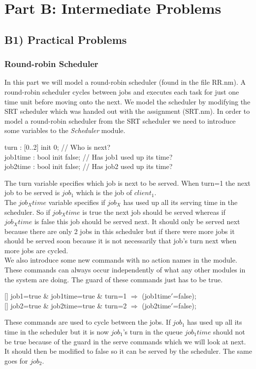 \documentclass[12pt]{report}
\begin{document}
\chapter*{Part B: Intermediate Problems}
\section*{B1) Practical Problems}
\subsection*{Round-robin Scheduler}
In this part we will model a round-robin scheduler (found in the file RR.nm). A round-robin scheduler cycles between jobs and executes each task for just one time unit before moving onto the next. We model the scheduler by modifying the SRT scheduler which was handed out with the assignment (SRT.nm). In order to model a round-robin scheduler from the SRT scheduler we need to introduce some variables to the \emph{Scheduler} module.
\begin{center}
turn : {[0..2]} init 0; // Who is next?\\
job1time : bool init false; // Has job1 used up its time?\\
job2time : bool init false; // Has job2 used up its time?\\
\end{center}
The turn variable specifies which job is next to be served. When turn=1 the next job to be served is $job_1$ which is the job of $client_1$.\\
The $job_Xtime$ variable specifies if $job_X$ has used up all its serving time in the scheduler. So if $job_Xtime$ is true the next job should be served whereas if $job_Xtime$ is false this job should be served next. It should only be served next because there are only 2 jobs in this scheduler but if there were more jobs it should be served soon because it is not necessarily that job's turn next when more jobs are cycled.\\
We also introduce some new commands with no action names in the module. These commands can always occur independently of what any other modules in the system are doing. The guard of these commands just has to be true.
\begin{center}
{[]} job1=true \& job1time=true \& turn=1 $\Rightarrow$ (job1time$'$=false);\\
{[]} job2=true \& job2time=true \& turn=2 $\Rightarrow$ (job2time$'$=false);
\end{center}
These commands are used to cycle between the jobs. If $job_1$ has used up all its time in the scheduler but it is now $job_1$'s turn in the queue $job_1time$ should not be true because of the guard in the serve commands which we will look at next. It should then be modified to false so it can be served by the scheduler. The same goes for $job_2$.\\
\end{document}
